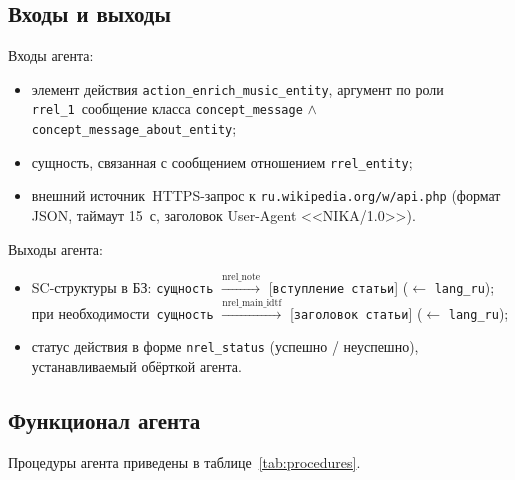 \subsection{Входы и выходы}

Входы агента:
\begin{itemize}
	\item элемент действия \texttt{action\_enrich\_music\_entity}, аргумент по роли \texttt{rrel\_1}~\mdash  сообщение класса \texttt{concept\_message} $\wedge$ \texttt{concept\_message\_about\_entity};
	\item сущность, связанная с сообщением отношением \texttt{rrel\_entity};
	\item внешний источник~\mdash  HTTPS-запрос к \texttt{ru.wikipedia.org/w/api.php} (формат JSON, таймаут 15~с, заголовок User-Agent <<NIKA/1.0>>).
\end{itemize}

Выходы агента:
\begin{itemize}
	\item SC-структуры в БЗ: \texttt{сущность} $\xrightarrow{\text{nrel\_note}}$ [\texttt{вступление статьи}] ($\leftarrow$ \texttt{lang\_ru}); при необходимости~\mdash  \texttt{сущность} $\xrightarrow{\text{nrel\_main\_idtf}}$ [\texttt{заголовок статьи}] ($\leftarrow$ \texttt{lang\_ru});
	\item статус действия в форме \texttt{nrel\_status} (успешно / неуспешно), устанавливаемый обёрткой агента.
\end{itemize}

\subsection{Функционал агента}

Процедуры агента приведены в таблице~\ref{tab:procedures}.

